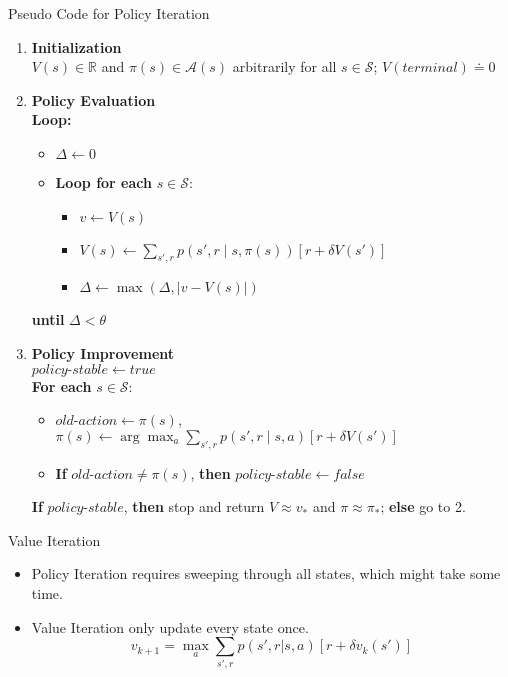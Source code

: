 \documentclass{beamer}
\begin{document}
\begin{frame}{Pseudo Code for Policy Iteration}
    \begin{enumerate}
    \item \textbf{Initialization} \\
    $V(s) \in \mathbb{R}$ and $\pi(s) \in \mathcal{A}(s)$ arbitrarily for all $s \in \mathcal{S}$; $V(terminal) \doteq 0$
    
    \item \textbf{Policy Evaluation} \\
    \textbf{Loop:}
    \begin{itemize}
        \item $\Delta \leftarrow 0$
        \item \textbf{Loop for each} $s \in \mathcal{S}$:
        \begin{itemize}
            \item $v \leftarrow V(s)$
            \item $V(s) \leftarrow \sum_{s',r} p(s',r \mid s, \pi(s)) [r + \delta V(s')]$
            \item $\Delta \leftarrow \max(\Delta, |v - V(s)|)$
        \end{itemize}
    \end{itemize}
    \textbf{until} $\Delta < \theta$ 
    
    \item \textbf{Policy Improvement} \\
    $policy\text{-}stable \leftarrow true$ \\
    \textbf{For each} $s \in \mathcal{S}$:
    \begin{itemize}
        \item $old\text{-}action \leftarrow \pi(s)$, $\pi(s) \leftarrow \arg\max_a \sum_{s',r} p(s',r \mid s, a) [r + \delta V(s')]$
        \item \textbf{If} $old\text{-}action \neq \pi(s)$, \textbf{then} $policy\text{-}stable \leftarrow false$
    \end{itemize}
    \textbf{If} $policy\text{-}stable$, \textbf{then} stop and return $V \approx v_* $ and $\pi \approx \pi_*$; \textbf{else} go to 2.
\end{enumerate}
\end{frame}

\begin{frame}{Value Iteration}
    \begin{itemize}
        \item Policy Iteration requires sweeping through all states, which might take some time.
        \item Value Iteration only update every state once.
        \[
        v_{k+1} = \max_a\sum_{s',r}p(s',r|s,a)[r+\delta v_k(s')]
        \]
    \end{itemize}
\end{frame}
\end{document}

